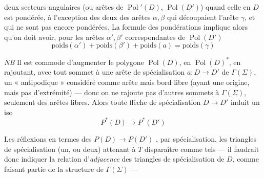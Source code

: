 \documentclass[11pt,a4paper]{article}
\begin{document}

deux secteurs angulaires (ou arêtes de $\operatorname{Pol}'(D)$, $\operatorname{Pol}(D')$) quand celle en $D$ est pondérée,  à l'exception des deux  des arêtes \struck{\ill{}} $\alpha, \beta$  qui découpaient l'arête $\gamma$, et qui ne sont pas encore pondérées. La formule des pondérations implique alors qu'on doit avoir, pour les arêtes $\alpha', \beta'$ correspondantes de $\operatorname{Pol}(D')$
\[
\text{poids}(\alpha') + \text{poids}(\beta') + \text{poids}(a) = \text{poids}(\gamma)
\]

\emph{NB} Il est commode d'augmenter le polygone $\operatorname{Pol}(D)$, en $\operatorname{Pol}(D)^{*}$, en rajoutant, avec tout sommet \struck{\ill{}}  à une arête de spécialisation \struck{\ill{}} $a : D \to D'$ de $\Gamma(\Sigma)$, un « antipodique » \struck{\ill{}}  considéré comme arête \ill{} mais bord libre (ayant une origine, mais pas d'extrémité) --- donc on ne rajoute pas d'autres sommets à $\Gamma(\Sigma)$, seulement des arêtes libres. Alors toute flèche de spécialisation $D \to D'$ induit un iso
\[
P^{*}(D) \to P^{*}(D')
\]

Les réflexions en termes des $P(D) \to P(D')$ ,   par spécialisation, les triangles de spécialisation (un, ou deux)  attenant à $T$   disparaître comme tels --- il faudrait donc indiquer la relation d'\emph{adjacence} des triangles de spécialisation de \struck{\ill{}} $D$, comme faisant partie de la structure de $\Gamma(\Sigma)$ ---
\end{document}
